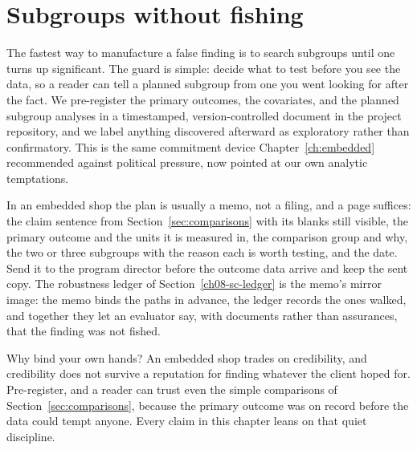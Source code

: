 \documentclass[
    a4paper,
    fontsize=10pt,
    twoside=true,
    numbers=noenddot,
]{kaobook}
\begin{document}
\section{Subgroups without fishing}\label{sec:prereg}
The fastest way to manufacture a false finding is to search subgroups until one turns up significant. The guard is simple: decide what to test before you see the data, so a reader can tell a planned subgroup from one you went looking for after the fact. We pre-register the primary outcomes, the covariates, and the planned subgroup analyses in a timestamped, version-controlled document in the project repository, and we label anything discovered afterward as exploratory rather than confirmatory. This is the same commitment device Chapter~\ref{ch:embedded} recommended against political pressure, now pointed at our own analytic temptations.

In an embedded shop the plan is usually a memo, not a filing, and a page suffices: the claim sentence from Section~\ref{sec:comparisons} with its blanks still visible, the primary outcome and the units it is measured in, the comparison group and why, the two or three subgroups with the reason each is worth testing, and the date. Send it to the program director before the outcome data arrive and keep the sent copy. The robustness ledger of Section~\ref{ch08-sc-ledger} is the memo's mirror image: the memo binds the paths in advance, the ledger records the ones walked, and together they let an evaluator say, with documents rather than assurances, that the finding was not fished.

Why bind your own hands? An embedded shop trades on credibility, and credibility does not survive a reputation for finding whatever the client hoped for. Pre-register, and a reader can trust even the simple comparisons of Section~\ref{sec:comparisons}, because the primary outcome was on record before the data could tempt anyone. Every claim in this chapter leans on that quiet discipline.
\end{document}
